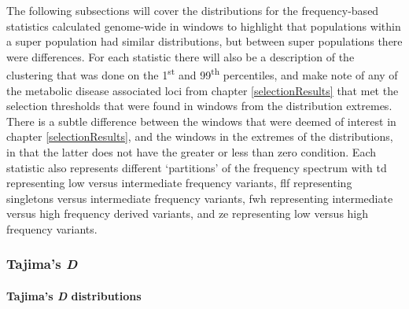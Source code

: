 \documentclass[]{report}
\let\oldparagraph\paragraph
\renewcommand{\paragraph}[1]{\oldparagraph{#1}\mbox{}}
\begin{document}
The following subsections will cover the distributions for the
frequency-based statistics calculated genome-wide in windows to
highlight that populations within a super population had similar
distributions, but between super populations there were differences. For
each statistic there will also be a description of the clustering that
was done on the 1\textsuperscript{st} and 99\textsuperscript{th}
percentiles, and make note of any of the metabolic disease associated
loci from chapter \ref{selectionResults} that met the selection
thresholds that were found in windows from the distribution extremes.
There is a subtle difference between the windows that were deemed of
interest in chapter \ref{selectionResults}, and the windows in the
extremes of the distributions, in that the latter does not have the
greater or less than zero condition. Each statistic also represents
different `partitions' of the frequency spectrum with \gls{td}
representing low versus intermediate frequency variants, \gls{flf}
representing singletons versus intermediate frequency variants,
\gls{fwh} representing intermediate versus high frequency derived
variants, and \gls{ze} representing low versus high frequency variants.

\subsubsection{\texorpdfstring{Tajima's
\emph{D}}{Tajima's D}}\label{tajimas-d-1}

\paragraph{\texorpdfstring{Tajima's \emph{D}
distributions}{Tajima's D distributions}}\label{tdDist}
\end{document}
